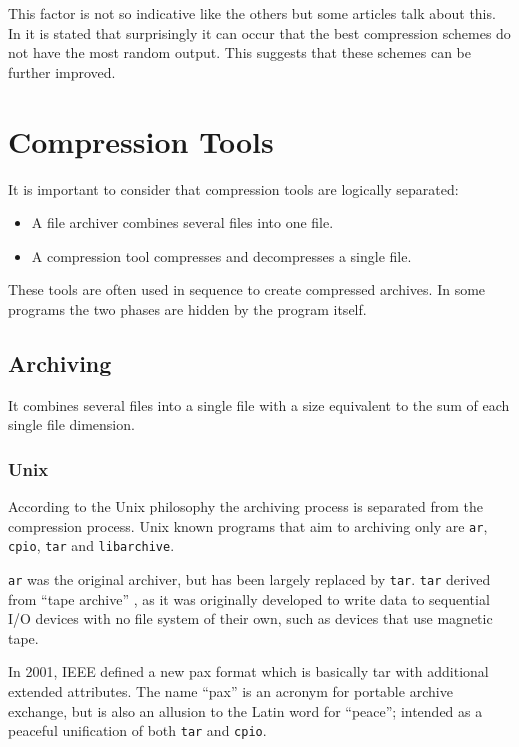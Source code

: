 \documentclass[12pt, a4paper]{report}
\begin{document}
This factor is not so indicative like the others but some articles talk about this.
In \cite{OnTheRandomnessOfCompressedData} it is stated that surprisingly it can occur that the best compression schemes do not
have the most random output.
This suggests that these schemes can be further improved.

\chapter{Compression Tools}

It is important to consider that compression tools are logically separated:

\begin{itemize}
  \item A file archiver combines several files into one file.
  \item A compression tool compresses and decompresses a single file.
\end{itemize}

These tools are often used in sequence to create compressed archives.
In some programs the two phases are hidden by the program itself.

\section{Archiving}

It combines several files into a single file with a size equivalent to the sum of each single file dimension.

\subsection{Unix}

According to the Unix philosophy the archiving process is separated from the compression process.
Unix known programs that aim to archiving only are \texttt{ar}, \texttt{cpio}, \texttt{tar} and \texttt{libarchive}.

\texttt{ar} was the original archiver, but has been largely replaced by \texttt{tar}.
\texttt{tar} derived from ``tape archive'' , as it was originally developed to write data to sequential I/O devices with no file
system of their own, such as devices that use magnetic tape.

In 2001, IEEE defined a new pax format which is basically tar with additional extended attributes.
The name ``pax'' is an acronym for portable archive exchange, but is also an allusion to the Latin word for ``peace''; intended as a
peaceful unification of both \texttt{tar} and \texttt{cpio}.
\end{document}
